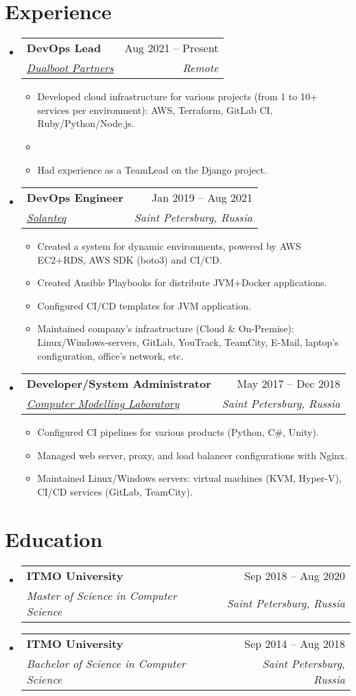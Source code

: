 \documentclass[a4paper,10pt]{article}
\makeatletter
\newcommand{\resumeItem}[1]{
  \item\small{#1}
}
\newcommand{\resumeItemListStart}{\begin{itemize}[rightmargin=0.11in]}
\newcommand{\resumeItemListEnd}{\end{itemize}}
\newcommand{\resumeQuadHeading}[4]{
  \item
  \begin{tabular*}{0.96\textwidth}[t]{l@{\extracolsep{\fill}}r}
    \textbf{#1} & #2 \\
    \textit{\small#3} & \textit{\small #4} \\
  \end{tabular*}
}
\newcommand{\resumeHeadingListStart}{
  \begin{itemize}[leftmargin=0.15in, label={}]
}
\newcommand{\resumeHeadingListEnd}{\end{itemize}}
\newcommand{\hrefUline}[2]{
  \href{#1}{\uline{#2}}
}
\makeatother
\begin{document}

\section{Experience}
\resumeHeadingListStart{}
  \resumeQuadHeading{DevOps Lead}{Aug 2021 -- Present}
  {\hrefUline{https://www.linkedin.com/company/dualbootpartners/}{Dualboot Partners}}{Remote}
  \resumeItemListStart{}
    \resumeItem{Developed cloud infrastructure for various projects (from 1 to 10+ services per environment): AWS, Terraform, GitLab CI, Ruby/Python/Node.js.}
    \resumeItem{}
    \resumeItem{Had experience as a TeamLead on the Django project.}
  \resumeItemListEnd{}

  \resumeQuadHeading{DevOps Engineer}{Jan 2019 -- Aug 2021}
  {\hrefUline{https://www.linkedin.com/company/solanteq/}{Solanteq}}{Saint Petersburg, Russia}
    \resumeItemListStart{}
      \resumeItem{Created a system for dynamic environments, powered by AWS EC2+RDS, AWS SDK (boto3) and CI/CD.}
      \resumeItem{Created Ansible Playbooks for distribute JVM+Docker applications.}
      \resumeItem{Configured CI/CD templates for JVM application.}
      \resumeItem{Maintained company's infrastructure (Cloud \& On-Premise): Linux/Windows-servers, GitLab, YouTrack, TeamCity, E-Mail, laptop's configuration, office's network, etc.}
    \resumeItemListEnd{}

  \resumeQuadHeading{Developer/System Administrator}{May 2017 -- Dec 2018}
  {\hrefUline{https://sim-lab.ru}{Computer Modelling Laboratory}}{Saint Petersburg, Russia}
    \resumeItemListStart{}
      \resumeItem{Configured CI pipelines for various products (Python, C\#, Unity).}
      \resumeItem{Managed web server, proxy, and load balancer configurations with Nginx.}
      \resumeItem{Maintained Linux/Windows servers: virtual machines (KVM, Hyper-V), CI/CD services (GitLab, TeamCity).}
    \resumeItemListEnd{}
\resumeHeadingListEnd{}



\section{Education}
  \resumeHeadingListStart{}
    \resumeQuadHeading{ITMO University}{Sep 2018 -- Aug 2020}
    {Master of Science in Computer Science}{Saint Petersburg, Russia}
    \resumeQuadHeading{ITMO University}{Sep 2014 -- Aug 2018}
    {Bachelor of Science in Computer Science}{Saint Petersburg, Russia}
  \resumeHeadingListEnd{}
\end{document}
